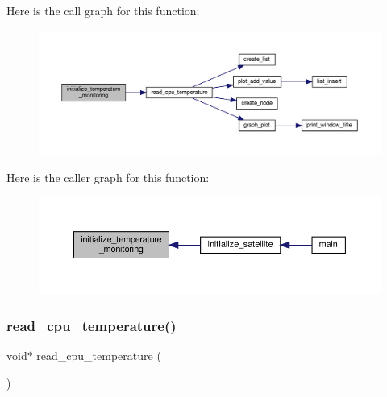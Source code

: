 Here is the call graph for this function\+:\nopagebreak
\begin{figure}[H]
\begin{center}
\leavevmode
\includegraphics[width=350pt]{temperature-monitoring_8c_a1d2bab81a3e6aa84eb0c2e0172594299_cgraph}
\end{center}
\end{figure}
Here is the caller graph for this function\+:\nopagebreak
\begin{figure}[H]
\begin{center}
\leavevmode
\includegraphics[width=350pt]{temperature-monitoring_8c_a1d2bab81a3e6aa84eb0c2e0172594299_icgraph}
\end{center}
\end{figure}
\mbox{\label{temperature-monitoring_8c_a6a33eb327dd6b9aac62b32cf7220cca0}} 
\subsubsection{\texorpdfstring{read\+\_\+cpu\+\_\+temperature()}{read\_cpu\_temperature()}}
{\footnotesize\ttfamily void$\ast$ read\+\_\+cpu\+\_\+temperature (\begin{DoxyParamCaption}{ }\end{DoxyParamCaption})}

